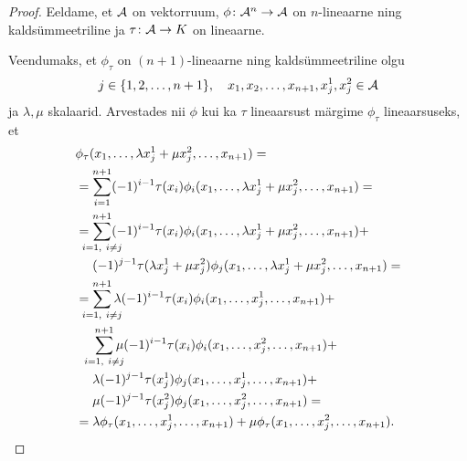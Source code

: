 \begin{proof}
    Eeldame, et $\mathcal{A}$ on vektorruum, $\phi \colon \mathcal{A}^n \to \mathcal{A}$ on
    $n$-lineaarne ning kaldsümmeetriline ja $\tau \colon \mathcal{A} \to K$
    on lineaarne.

    Veendumaks, et $\phi_\tau$ on $(n+1)$-lineaarne ning
    kaldsümmeetriline olgu
    \[
        j \in \{1, 2, \dots, n+1\},
        \quad
        x_1, x_2, \dots, x_{n+1}, x_j^1, x_j^2 \in \mathcal{A}
    \]
    ja $\lambda, \mu$ skalaarid. Arvestades nii
    $\phi$ kui ka $\tau$ lineaarsust märgime $\phi_\tau$
    lineaarsuseks, et
    \begin{align*}
        &\phi_\tau(
            x_1, \dots, \lambda x_j^1 + \mu x_j^2, \dots, x_{n+1}
        ) = \\
        &= \sum_{i=1}^{n+1} (-1)^{i-1} \tau(x_i) \phi_i(
             x_1, \dots, \lambda x_j^1 + \mu x_j^2, \dots, x_{n+1}
           ) = \\
        &= \sum_{\mathclap{i=1,\ i \ne j}}^{n+1} (-1)^{i-1}
           \tau(x_i) \phi_i(
             x_1, \dots, \lambda x_j^1 + \mu x_j^2, \dots, x_{n+1}
           ) + \\
        &\quad\ (-1)^{j-1} \tau(\lambda x_j^1 + \mu x_j^2)
           \phi_j(
             x_1, \dots, \lambda x_j^1 + \mu x_j^2, \dots, x_{n+1}
           ) = \\
        &= \sum_{\mathclap{i=1,\ i \ne j}}^{n+1}
           \lambda (-1)^{i-1} \tau(x_i) \phi_i(
             x_1, \dots, x_j^1, \dots, x_{n+1}
           ) + \\
        &\quad\ \sum_{\mathclap{i=1,\ i \ne j}}^{n+1} \mu
           (-1)^{i-1} \tau(x_i)
           \phi_i( x_1, \dots, x_j^2, \dots, x_{n+1} ) + \\
        &\quad\ \lambda (-1)^{j-1} \tau(x_j^1) \phi_j(
             x_1, \dots, x_j^1, \dots, x_{n+1}) + \\
        &\quad\ \mu (-1)^{j-1} \tau(x_j^2) \phi_j(
             x_1, \dots, x_j^2, \dots, x_{n+1}) = \\
        &= \lambda \phi_\tau(x_1, \dots, x_j^1, \dots, x_{n+1}) +
           \mu \phi_\tau(x_1, \dots, x_j^2, \dots, x_{n+1}).
    \end{align*}


\end{proof}
